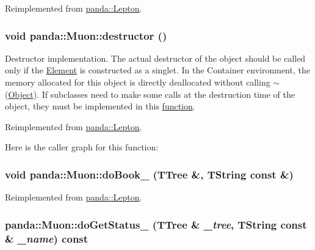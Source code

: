 Reimplemented from \hyperlink{classpanda_1_1Lepton_a13fd748ab9e1b76e5cc8391723cc5ea7}{panda::Lepton}.\hypertarget{classpanda_1_1Muon_aa982002bedb53cacab127270c53e54e8}{
\subsubsection[{destructor}]{\setlength{\rightskip}{0pt plus 5cm}void panda::Muon::destructor ()}}
\label{classpanda_1_1Muon_aa982002bedb53cacab127270c53e54e8}


Destructor implementation. The actual destructor of the object should be called only if the \hyperlink{classpanda_1_1Element}{Element} is constructed as a singlet. In the Container environment, the memory allocated for this object is directly deallocated without calling $\sim$(\hyperlink{classpanda_1_1Object}{Object}). If subclasses need to make some calls at the destruction time of the object, they must be implemented in this \hyperlink{namespacepanda_1_1function}{function}. 

Reimplemented from \hyperlink{classpanda_1_1Lepton_af8bb4d531bdddbf51f479f7eb0dae175}{panda::Lepton}.

Here is the caller graph for this function:\hypertarget{classpanda_1_1Muon_af27e42e8f6276dcbcf61ac742b17a4cd}{
\subsubsection[{doBook\_\-}]{\setlength{\rightskip}{0pt plus 5cm}void panda::Muon::doBook\_\- (TTree \&, \/  TString const \&)}}
\label{classpanda_1_1Muon_af27e42e8f6276dcbcf61ac742b17a4cd}


Reimplemented from \hyperlink{classpanda_1_1Lepton_af9d74c974117a26f53e60da918cb84ba}{panda::Lepton}.\hypertarget{classpanda_1_1Muon_af2331a81be13a07cc0202a6d107b0685}{
\subsubsection[{doGetStatus\_\-}]{ panda::Muon::doGetStatus\_\- (TTree \& {\em \_\-tree}, \/  TString const \& {\em \_\-name}) const}}
\label{classpanda_1_1Muon_af2331a81be13a07cc0202a6d107b0685}


